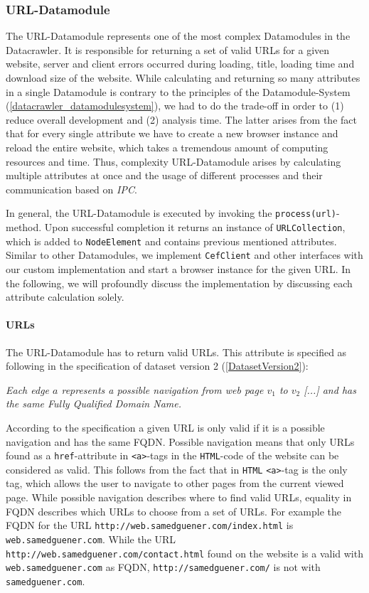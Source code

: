 \subsubsection{URL-Datamodule}
\label{datacrawler_url_datamodule}
The URL-Datamodule represents one of the most complex Datamodules in the Datacrawler. It is responsible for returning a set of valid URLs for a given website, server and client errors occurred during loading, title, loading time and download size of the website. While calculating and returning so many attributes in a single Datamodule is contrary to the principles of the Datamodule-System (\ref{datacrawler_datamodulesystem}), we had to do the trade-off in order to (1) reduce overall development and (2) analysis time. The latter arises from the fact that for every single attribute we have to create a new browser instance and reload the entire website, which takes a tremendous amount of computing resources and time. Thus, complexity URL-Datamodule arises by calculating multiple attributes at once and the usage of different processes and their communication based on \textit{IPC}.

In general, the URL-Datamodule is executed by invoking the \texttt{process(url)}-method. Upon successful completion it returns an instance of \texttt{URLCollection}, which is added to \texttt{NodeElement} and contains previous mentioned attributes. Similar to other Datamodules, we implement \texttt{CefClient} and other interfaces with our custom implementation and start a browser instance for the given URL. In the following, we will profoundly discuss the implementation by discussing each attribute calculation solely.

\paragraph{URLs}
The URL-Datamodule has to return valid URLs. This attribute is specified as following in the specification of dataset version 2 (\ref{DatasetVersion2}):

\begin{center}
	\textit{Each edge $a$ represents a possible navigation from web page $v_1$ to $v_2$ [...] and has the same Fully Qualified Domain Name.}
\end{center}

According to the specification a given URL is only valid if it is a possible navigation and has the same FQDN. Possible navigation means that only URLs found as a \texttt{href}-attribute in \texttt{<a>}-tags in the \texttt{HTML}-code of the website can be considered as valid. This follows from the fact that in \texttt{HTML} \texttt{<a>}-tag is the only tag, which allows the user to navigate to other pages from the current viewed page. While possible navigation describes where to find valid URLs, equality in FQDN describes which URLs to choose from a set of URLs.
For example the FQDN for the URL \texttt{http://web.samedguener.com/index.html} is \texttt{web.samedguener.com}. While the URL \texttt{http://web.samedguener.com/contact.html} found on the website is a valid with \texttt{web.samedguener.com} as FQDN, \texttt{http://samedguener.com/} is not with \texttt{samedguener.com}.

